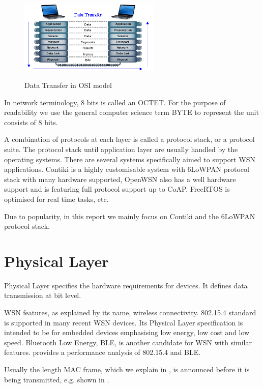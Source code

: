 \begin{figure}
	\centering
	{
		\includegraphics[width=0.6\textwidth,]{fig/osi-model.png}
	}
	\caption{Data Transfer in OSI model} \label{fig: OSI channel}
\end{figure}

In network terminology, 8 bits is called an OCTET. For the purpose of readability we use the general computer science term BYTE to represent the unit consists of 8 bits.

A combination of protocols at each layer is called a protocol stack, or a protocol suite. The protocol stack until application layer are usually handled by the operating systems. There are several systems specifically aimed to support WSN applications. Contiki\cite{Contiki} is a highly customisable system with 6LoWPAN protocol stack with many hardware supported, OpenWSN\cite{OpenWSN} also has a well hardware support and is featuring full protocol support up to CoAP\cite{rfc7252}, FreeRTOS\cite{FreeRTOS} is optimised for real time tasks, etc.

Due to popularity, in this report we mainly focus on Contiki and the 6LoWPAN protocol stack.

\section{Physical Layer}
Physical Layer specifies the hardware requirements for devices. It defines data transmission at bit level.

WSN features, as explained by its name, wireless connectivity. 802.15.4\cite{802154} standard is supported in many recent WSN devices. Its Physical Layer specification is intended to be for embedded devices emphasising low energy, low cost and low speed. Bluetooth Low Energy, BLE, is another candidate for WSN with similar features. \cite{802154BLE} provides a performance analysis of 802.15.4 and BLE.

Usually the length MAC frame, which we explain in , is announced before it is being transmitted, e.g. shown in .

